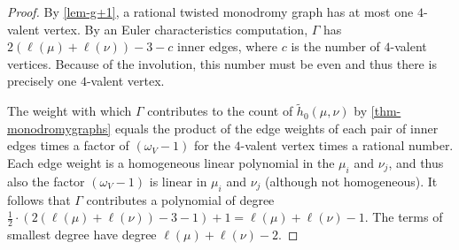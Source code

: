  \begin{proof}
 By \cref{lem-g+1}, a rational twisted monodromy graph has at most one $4$-valent vertex. By an Euler characteristics computation, $\Gamma$ has $2(\ell(\mu)+\ell(\nu))-3-c$ inner edges, where $c$ is the number of $4$-valent vertices. Because of the involution, this number must be even and thus there is precisely one $4$-valent vertex.
 
 The weight with which $\Gamma$ contributes to the count of $\tilde{h}_0(\mu,\nu)$ by \cref{thm-monodromygraphs} equals the product of the edge weights of each pair of inner edges times a factor of $(\omega_V-1)$ for the $4$-valent vertex times a rational number.
 Each edge weight is a homogeneous linear polynomial in the $\mu_i$ and $\nu_j$, and thus also the factor $(\omega_V-1)$ is linear in $\mu_i$ and $\nu_j$ (although not homogeneous).
 It follows that $\Gamma$ contributes a polynomial of degree $\frac{1}{2}\cdot (2(\ell(\mu)+\ell(\nu))-3-1)+1= \ell(\mu)+\ell(\nu)-1$. The terms of smallest degree have degree $\ell(\mu)+\ell(\nu)-2$.
 \end{proof}

